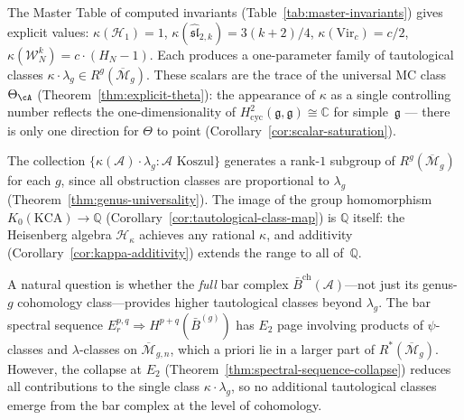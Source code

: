 \begin{remark}\label{rem:tautological-master-table}
The Master Table of computed invariants (Table~\ref{tab:master-invariants}) gives explicit values: $\kappa(\mathcal{H}_1) = 1$, $\kappa(\widehat{\mathfrak{sl}}_{2,k}) = 3(k+2)/4$, $\kappa(\mathrm{Vir}_c) = c/2$, $\kappa(\mathcal{W}_N^k) = c \cdot (H_N - 1)$.  Each produces a one-parameter family of tautological classes $\kappa \cdot \lambda_g \in R^g(\overline{\mathcal{M}}_g)$.
These scalars are the trace of the universal MC class
$\Theta_{\cA}$ (Theorem~\ref{thm:explicit-theta}):
the appearance of $\kappa$ as a single controlling number
reflects the one-dimensionality of
$H^2_{\mathrm{cyc}}(\mathfrak{g},\mathfrak{g}) \cong \mathbb{C}$
for simple~$\mathfrak{g}$ --- there is only one direction for
$\Theta$ to point
(Corollary~\ref{cor:scalar-saturation}).
\end{remark}

\begin{remark}\label{rem:tautological-span}
The collection $\{\kappa(\mathcal{A}) \cdot \lambda_g : \mathcal{A} \text{ Koszul}\}$ generates a rank-$1$ subgroup of $R^g(\overline{\mathcal{M}}_g)$ for each $g$, since all obstruction classes are proportional to $\lambda_g$ (Theorem~\ref{thm:genus-universality}).  The image of the group homomorphism $K_0(\mathrm{KCA}) \to \mathbb{Q}$ (Corollary~\ref{cor:tautological-class-map}) is $\mathbb{Q}$ itself: the Heisenberg algebra $\mathcal{H}_\kappa$ achieves any rational $\kappa$, and additivity (Corollary~\ref{cor:kappa-additivity}) extends the range to all of~$\mathbb{Q}$.

A natural question is whether the \emph{full} bar complex $\bar{B}^{\mathrm{ch}}(\mathcal{A})$---not just its genus-$g$ cohomology class---provides higher tautological classes beyond $\lambda_g$.  The bar spectral sequence $E_r^{p,q} \Rightarrow H^{p+q}(\bar{B}^{(g)})$ has $E_2$ page involving products of $\psi$-classes and $\lambda$-classes on $\overline{\mathcal{M}}_{g,n}$, which a priori lie in a larger part of $R^*(\overline{\mathcal{M}}_g)$.  However, the collapse at $E_2$ (Theorem~\ref{thm:spectral-sequence-collapse}) reduces all contributions to the single class $\kappa \cdot \lambda_g$, so no additional tautological classes emerge from the bar complex at the level of cohomology.
\end{remark}

